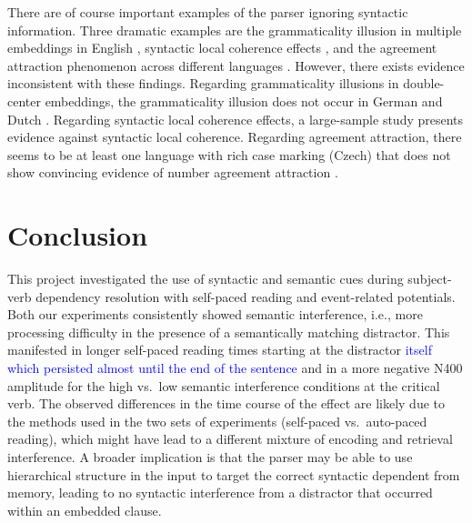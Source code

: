 \documentclass[review,preprint,12pt,authoryear,floatsintext]{elsarticle}
\begin{document}
{{There are of course important examples of the parser ignoring syntactic information. Three dramatic examples are the grammaticality illusion in multiple embeddings in English \citep{gibsonthomas99}, syntactic local coherence effects \citep{taboretal04}, and the agreement attraction phenomenon across different languages \citep[e.g.,][]{wagersetal,lago_etal_2021,tucker2015representing}.  However, there exists  evidence inconsistent with these findings. Regarding grammaticality illusions in double-center embeddings, the grammaticality illusion does not occur in German and Dutch \citep{VSLK11,FrankEtAl2015}. Regarding syntactic local coherence effects, a large-sample study \citep{lcpaape2025} presents evidence against syntactic local coherence. Regarding agreement attraction, there seems to be at least one language with rich case marking (Czech) that does not show convincing evidence of number agreement attraction \citep{chromy2023number}. \label{gendisccaveat} \label{gendisccaveat2}

\section*{Conclusion}
This project investigated the use of  syntactic and semantic cues during subject-verb dependency resolution with self-paced reading and event-related potentials. Both our experiments consistently showed semantic interference, i.e., more processing difficulty in the presence of a semantically matching distractor. This manifested in longer self-paced reading times starting at the distractor \textcolor{blue}{itself which persisted almost until the end of the sentence} and in a more negative N400 amplitude for the high vs.\ low semantic interference conditions at the critical verb. The observed differences in the time course of the effect are likely due to the methods used in the two sets of experiments (self-paced vs.\ auto-paced reading), which might have lead to a different mixture of encoding and retrieval interference. \label{thisdesign3}  A broader implication is that the parser may be able to use hierarchical structure in the input to target the correct syntactic dependent from memory, leading to no syntactic interference from a distractor that occurred within an embedded clause.

}}
\end{document}
